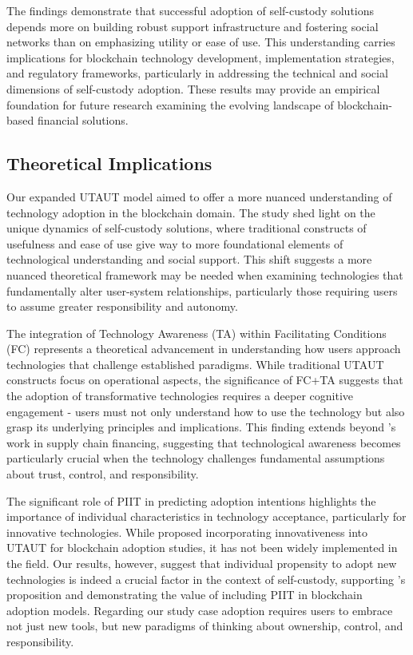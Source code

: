 \documentclass[twocolumn]{article}
\begin{document}
The findings demonstrate that successful adoption of self-custody solutions depends more on building robust support infrastructure and fostering social networks than on emphasizing utility or ease of use. This understanding carries implications for blockchain technology development, implementation strategies, and regulatory frameworks, particularly in addressing the technical and social dimensions of self-custody adoption. These results may provide an empirical foundation for future research examining the evolving landscape of blockchain-based financial solutions.

\subsection{Theoretical Implications}

Our expanded UTAUT model aimed to offer a more nuanced understanding of technology adoption in the blockchain domain. The study shed light on the unique dynamics of self-custody solutions, where traditional constructs of usefulness and ease of use give way to more foundational elements of technological understanding and social support. This shift suggests a more nuanced theoretical framework may be needed when examining technologies that fundamentally alter user-system relationships, particularly those requiring users to assume greater responsibility and autonomy.

The integration of Technology Awareness (TA) within Facilitating Conditions (FC) represents a theoretical advancement in understanding how users approach technologies that challenge established paradigms. While traditional UTAUT constructs focus on operational aspects, the significance of FC+TA suggests that the adoption of transformative technologies requires a deeper cognitive engagement - users must not only understand how to use the technology but also grasp its underlying principles and implications. This finding extends beyond \textcite{kabir_application_2021}'s work in supply chain financing, suggesting that technological awareness becomes particularly crucial when the technology challenges fundamental assumptions about trust, control, and responsibility.

The significant role of PIIT in predicting adoption intentions highlights the importance of individual characteristics in technology acceptance, particularly for innovative technologies. While \textcite{ng_factors_2021} proposed incorporating innovativeness into UTAUT for blockchain adoption studies, it has not been widely implemented in the field. Our results, however, suggest that individual propensity to adopt new technologies is indeed a crucial factor in the context of self-custody, supporting \textcite{ng_factors_2021}'s proposition and demonstrating the value of including PIIT in blockchain adoption models. Regarding our study case adoption requires users to embrace not just new tools, but new paradigms of thinking about ownership, control, and responsibility.
\end{document}
